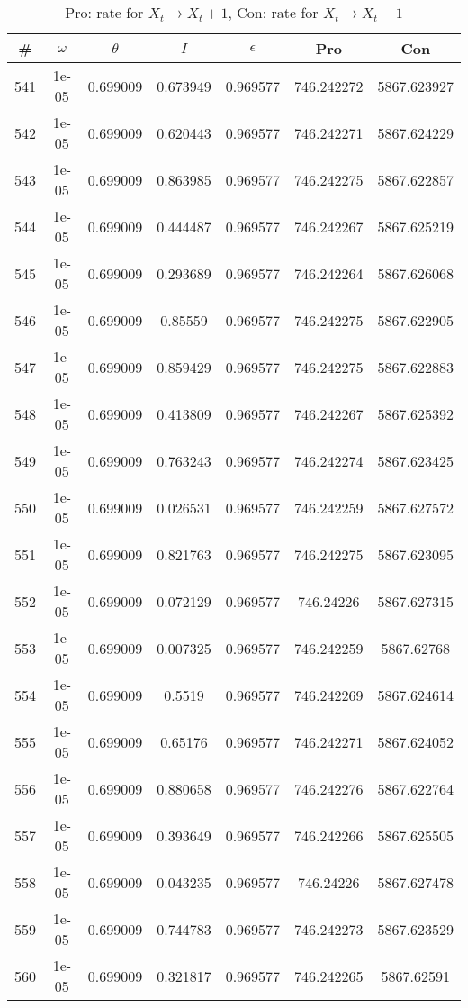 \newpage
\begin{table}
\caption{Pro: rate for $X_t \rightarrow X_t + 1$, Con: rate for $X_t \rightarrow X_t - 1$}
\begin{tabular*}{\linewidth}{c|c|c|c|c|c|c}
\# & $\omega$ & $\theta$ & $I$ & $\epsilon$ & Pro & Con \\
\hline
541 & 1e-05 & 0.699009 & 0.673949 & 0.969577 & 746.242272 & 5867.623927\\
542 & 1e-05 & 0.699009 & 0.620443 & 0.969577 & 746.242271 & 5867.624229\\
543 & 1e-05 & 0.699009 & 0.863985 & 0.969577 & 746.242275 & 5867.622857\\
544 & 1e-05 & 0.699009 & 0.444487 & 0.969577 & 746.242267 & 5867.625219\\
545 & 1e-05 & 0.699009 & 0.293689 & 0.969577 & 746.242264 & 5867.626068\\
546 & 1e-05 & 0.699009 & 0.85559 & 0.969577 & 746.242275 & 5867.622905\\
547 & 1e-05 & 0.699009 & 0.859429 & 0.969577 & 746.242275 & 5867.622883\\
548 & 1e-05 & 0.699009 & 0.413809 & 0.969577 & 746.242267 & 5867.625392\\
549 & 1e-05 & 0.699009 & 0.763243 & 0.969577 & 746.242274 & 5867.623425\\
550 & 1e-05 & 0.699009 & 0.026531 & 0.969577 & 746.242259 & 5867.627572\\
551 & 1e-05 & 0.699009 & 0.821763 & 0.969577 & 746.242275 & 5867.623095\\
552 & 1e-05 & 0.699009 & 0.072129 & 0.969577 & 746.24226 & 5867.627315\\
553 & 1e-05 & 0.699009 & 0.007325 & 0.969577 & 746.242259 & 5867.62768\\
554 & 1e-05 & 0.699009 & 0.5519 & 0.969577 & 746.242269 & 5867.624614\\
555 & 1e-05 & 0.699009 & 0.65176 & 0.969577 & 746.242271 & 5867.624052\\
556 & 1e-05 & 0.699009 & 0.880658 & 0.969577 & 746.242276 & 5867.622764\\
557 & 1e-05 & 0.699009 & 0.393649 & 0.969577 & 746.242266 & 5867.625505\\
558 & 1e-05 & 0.699009 & 0.043235 & 0.969577 & 746.24226 & 5867.627478\\
559 & 1e-05 & 0.699009 & 0.744783 & 0.969577 & 746.242273 & 5867.623529\\
560 & 1e-05 & 0.699009 & 0.321817 & 0.969577 & 746.242265 & 5867.62591\\

\end{tabular*}
\end{table}
